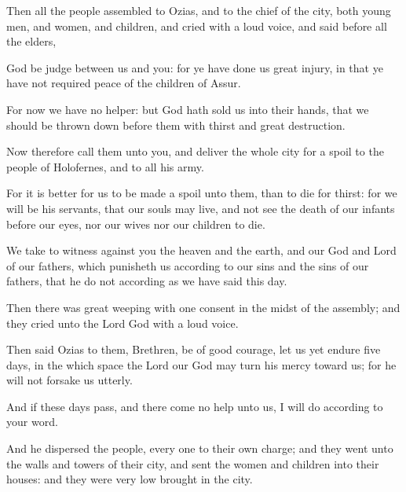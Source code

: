 {\par }{\PP {}Then all the people assembled to Ozias, and to the chief of the city, both young men, and women, and children, and cried with a loud voice, and said before all the elders,
\par }{\PP {}God be judge between us and you: for ye have done us great injury, in that ye have not required peace of the children of Assur.
\par }{\PP {}For now we have no helper: but God hath sold us into their hands, that we should be thrown down before them with thirst and great destruction.
\par }{\PP {}Now therefore call them unto you, and deliver the whole city for a spoil to the people of Holofernes, and to all his army.
\par }{\PP {}For it is better for us to be made a spoil unto them, than to die for thirst: for we will be his servants, that our souls may live, and not see the death of our infants before our eyes, nor our wives nor our children to die.
\par }{\PP {}We take to witness against you the heaven and the earth, and our God and Lord of our fathers, which punisheth us according to our sins and the sins of our fathers, that he do not according as we have said this day.
\par }{\PP {}Then there was great weeping with one consent in the midst of the assembly; and they cried unto the Lord God with a loud voice.
\par }{\PP {}Then said Ozias to them, Brethren, be of good courage, let us yet endure five days, in the which space the Lord our God may turn his mercy toward us; for he will not forsake us utterly.
\par }{\PP {}And if these days pass, and there come no help unto us, I will do according to your word.
\par }{\PP {}And he dispersed the people, every one to their own charge; and they went unto the walls and towers of their city, and sent the women and children into their houses: and they were very low brought in the city.

}
